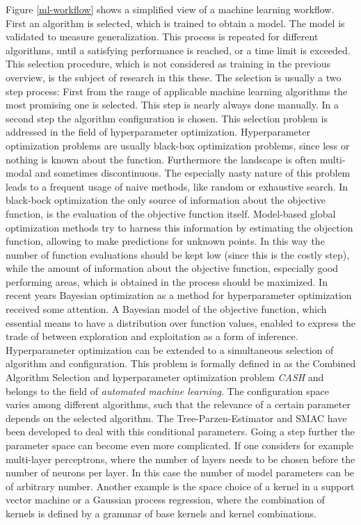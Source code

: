\documentclass[english]{article}
\begin{document}
Figure \ref{ml-workflow} shows a simplified view of a machine learning workflow. First an algorithm is selected, which is trained to obtain a model. The model is validated to measure generalization. This process is repeated for different algorithms, until a satisfying performance is reached, or a time limit is exceeded. This selection procedure, which is not considered as training in the previous overview, is the subject of research in this these.
The selection is usually a two step process: First from the range of applicable machine learning algorithms the most promising one is selected. This step is nearly always done manually. In a second step the algorithm configuration is chosen. This selection problem is addressed in the field of hyperparameter optimization.
Hyperparameter optimization problems are usually black-box optimization problems, since less or nothing is known about the function. Furthermore the  landscape is often multi-modal and sometimes discontinuous. The especially nasty nature of this problem leads to a frequent usage of naive methods, like random or exhaustive search.
In black-bock optimization the only source of information about the objective function, is the evaluation of the objective function itself. Model-based global optimization methods try to harness this information by estimating the objection function, allowing to make predictions for unknown points. In this way the number of function evaluations should be kept low (since this is the costly step), while the amount of information about the objective function, especially good performing areas, which is obtained in the process should be maximized.
In recent years Bayesian optimization as a method for hyperparameter optimization received some attention. A Bayesian model of the objective function, which essential means to have a distribution over function values, enabled to express the trade of between exploration and exploitation as a form of inference.
Hyperparameter optimization can be extended to a simultaneous selection of algorithm and configuration. This problem is formally defined in \cite{feurer_efficient_2015} as the Combined Algorithm Selection and hyperparameter optimization problem \textit{CASH} and belongs to the field of \textit{automated machine learning}. The configuration space varies among different algorithms, such that the relevance of a certain parameter depends on the selected algorithm. The Tree-Parzen-Estimator and SMAC have been developed to deal with this conditional parameters.
Going a step further the parameter space can become even more complicated. If one considers for example multi-layer perceptrons, where the number of layers needs to be chosen before the number of neurons per layer. In this case the number of model parameters can be of arbitrary number. Another example is the space choice of a kernel in a support vector machine or a Gaussian process regression, where the combination of kernels is defined by a grammar of base kernels and kernel combinations.
\end{document}
